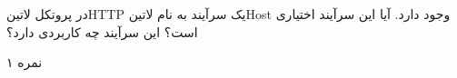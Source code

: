 \documentclass[../main.tex]{subfiles}
\begin{document}

در پروتکل ‌لاتین{HTTP} یک سرآیند به نام ‌لاتین{Host} وجود دارد. آیا این سرآیند اختیاری است؟ این سرآیند چه کاربردی دارد؟

۱ نمره
\end{document}
